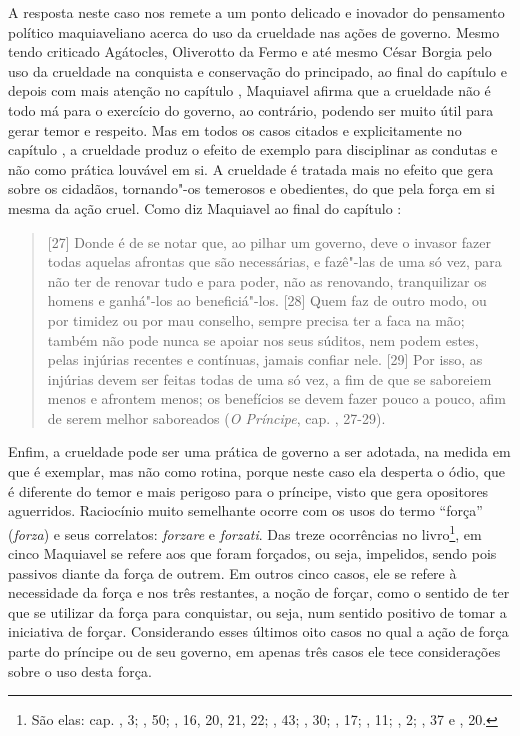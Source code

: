 A resposta neste caso nos remete a um ponto delicado e inovador do
pensamento político maquiaveliano acerca do uso da crueldade nas ações
de governo. Mesmo tendo criticado Agátocles, Oliverotto da Fermo e até
mesmo César Borgia pelo uso da crueldade na conquista e conservação do
principado, ao final do capítulo  e depois com mais atenção no
capítulo , Maquiavel afirma que a crueldade não é todo má para o
exercício do governo, ao contrário, podendo ser muito útil para gerar
temor e respeito. Mas em todos os casos citados e explicitamente no
capítulo , a crueldade produz o efeito de exemplo para disciplinar
as condutas e não como prática louvável em si. A crueldade é tratada
mais no efeito que gera sobre os cidadãos, tornando"-os temerosos e
obedientes, do que pela força em si mesma da ação cruel. Como diz
Maquiavel ao final do capítulo :

\begin{quote}
{[}27{]} Donde é de se notar que, ao pilhar um governo, deve o
invasor fazer todas aquelas afrontas que são necessárias, e fazê"-las de
uma só vez, para não ter de renovar tudo e para poder, não as renovando,
tranquilizar os homens e ganhá"-los ao beneficiá"-los. {[}28{]} Quem faz
de outro modo, ou por timidez ou por mau conselho, sempre precisa ter a
faca na mão; também não pode nunca se apoiar nos seus súditos, nem podem
estes, pelas injúrias recentes e contínuas, jamais confiar nele.
{[}29{]} Por isso, as injúrias devem ser feitas todas de uma só vez, a
fim de que se saboreiem menos e afrontem menos; os benefícios se devem
fazer pouco a pouco, afim de serem melhor saboreados (\emph{O Príncipe},
cap. , 27-29).
\end{quote}

Enfim, a crueldade pode ser uma prática de governo a ser adotada, na
medida em que é exemplar, mas não como rotina, porque neste caso ela
desperta o ódio, que é diferente do temor e mais perigoso para o
príncipe, visto que gera opositores aguerridos. Raciocínio muito
semelhante ocorre com os usos do termo ``força'' (\emph{forza}) e seus
correlatos: \emph{forzare} e \emph{forzati}. Das treze ocorrências no
livro\footnote{São elas: cap. , 3; , 50; , 16, 20, 21, 22; , 43; , 30;
  , 17; , 11; , 2; , 37 e , 20.}, em cinco Maquiavel se refere aos que foram forçados, ou
seja, impelidos, sendo pois passivos diante da força de outrem. Em
outros cinco casos, ele se refere à necessidade da força e nos três
restantes, a noção de forçar, como o sentido de ter que se utilizar da
força para conquistar, ou seja, num sentido positivo de tomar a
iniciativa de forçar. Considerando esses últimos oito casos no qual a
ação de força parte do príncipe ou de seu governo, em apenas três casos
ele tece considerações sobre o uso desta força.

